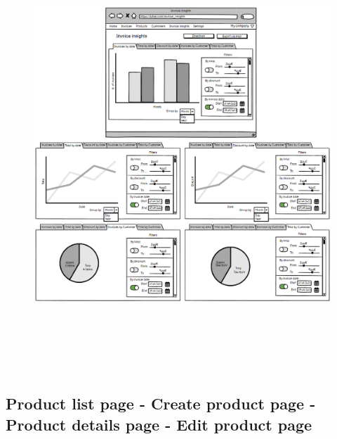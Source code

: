 \begin{figure}[h!]
    \centering
    \includegraphics[height=460pt, keepaspectratio]{resources/mockup/Invoice_insights.png}
\end{figure}
\newpage

\subsection{Product list page - Create product page - Product details page - Edit product page}

